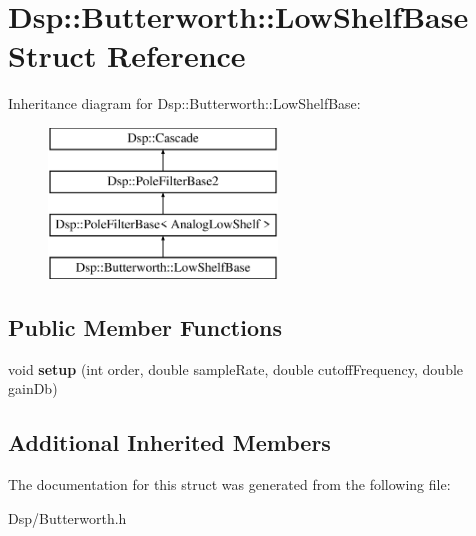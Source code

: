 \hypertarget{structDsp_1_1Butterworth_1_1LowShelfBase}{\section{Dsp\-:\-:Butterworth\-:\-:Low\-Shelf\-Base Struct Reference}
\label{structDsp_1_1Butterworth_1_1LowShelfBase}
}
Inheritance diagram for Dsp\-:\-:Butterworth\-:\-:Low\-Shelf\-Base\-:\begin{figure}[H]
\begin{center}
\leavevmode
\includegraphics[height=4.000000cm]{structDsp_1_1Butterworth_1_1LowShelfBase}
\end{center}
\end{figure}
\subsection*{Public Member Functions}
\begin{DoxyCompactItemize}
\item 
\hypertarget{structDsp_1_1Butterworth_1_1LowShelfBase_aaac85875dfde3ea4e3d4309c66a74a47}{void {\bfseries setup} (int order, double sample\-Rate, double cutoff\-Frequency, double gain\-Db)}\label{structDsp_1_1Butterworth_1_1LowShelfBase_aaac85875dfde3ea4e3d4309c66a74a47}

\end{DoxyCompactItemize}
\subsection*{Additional Inherited Members}


The documentation for this struct was generated from the following file\-:\begin{DoxyCompactItemize}
\item 
Dsp/Butterworth.\-h\end{DoxyCompactItemize}
